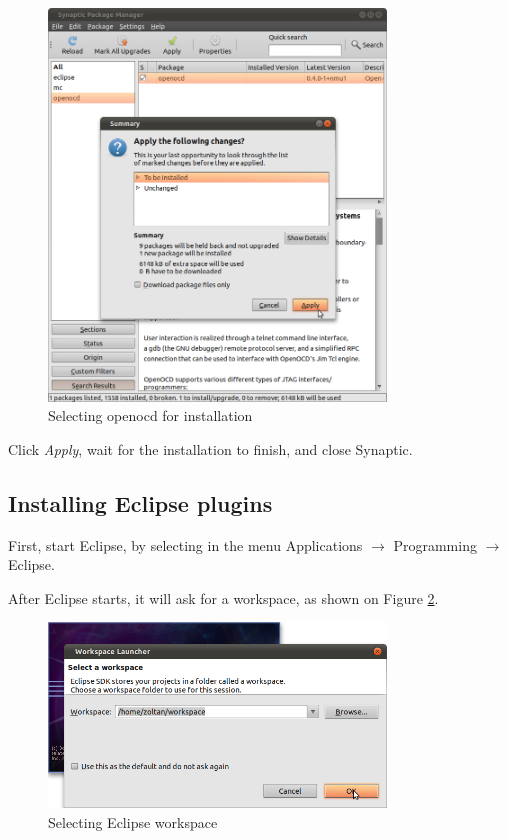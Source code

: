 \documentclass[a4paper, 10pt]{article}
\begin{document}
    \begin{figure}[H]
    \centering
        \includegraphics[width=0.8\textwidth]{./install-guide-linux-images/synaptic-apply-changes.png}
        \caption{Selecting openocd for installation}
        \label{fig:synaptic-apply-changes.png}
    \end{figure}

Click \emph{Apply}, wait for the installation to finish, and close Synaptic.

\subsection{Installing Eclipse plugins}

First, start Eclipse, by selecting in the menu Applications $\rightarrow$
Programming $\rightarrow$ Eclipse.

After Eclipse starts, it will ask for a workspace, as shown on Figure \ref{fig:eclipse-workspace}.

    \begin{figure}[H]
    \centering
        \includegraphics[width=0.8\textwidth]{./install-guide-linux-images/eclipse-workspace.png}
        \caption{Selecting Eclipse workspace}
        \label{fig:eclipse-workspace}
    \end{figure}
\end{document}
